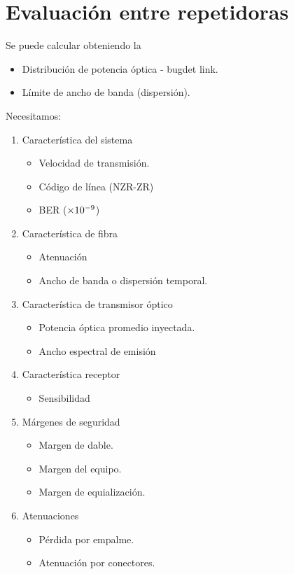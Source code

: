 \documentclass[
	12pt, %
	fleqn, %
	a4paper, %
	oneside, %
]{LegrandOrangeBook}
\begin{document}
\section{Evaluación entre repetidoras}
Se puede calcular obteniendo la
\begin{itemize}
\item Distribución de potencia óptica - bugdet link.
\item Límite de ancho de banda (dispersión).
\end{itemize}
Necesitamos:
\begin{enumerate}
\item Característica del sistema
\begin{itemize}
\item Velocidad de transmisión.
\item Código de línea (NZR-ZR)
\item BER ($\times 10^{-9}$) 
\end{itemize}
\item Característica de fibra
\begin{itemize}
\item Atenuación
\item Ancho de banda o dispersión temporal.
\end{itemize}
\item Característica de transmisor óptico
\begin{itemize}
\item Potencia óptica promedio inyectada.
\item Ancho espectral de emisión
\end{itemize}
\item Característica receptor
\begin{itemize}
\item Sensibilidad
\end{itemize}
\item Márgenes de seguridad
\begin{itemize}
\item Margen de dable.
\item Margen del equipo.
\item Margen de equialización.
\end{itemize}
\item Atenuaciones
\begin{itemize}
\item Pérdida por empalme.
\item Atenuación por conectores.
\end{itemize}
\end{enumerate}
\end{document}
